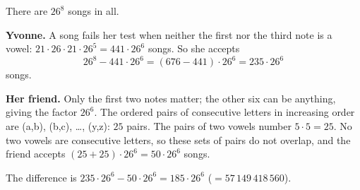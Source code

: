 There are $26^8$ songs in all.

\textbf{Yvonne.} A song fails her test when neither the first nor the third note is a vowel: $21\cdot26\cdot21\cdot26^5=441\cdot26^6$ songs. So she accepts
\[
26^8-441\cdot26^6=(676-441)\cdot26^6=235\cdot26^6
\]
songs.

\textbf{Her friend.} Only the first two notes matter; the other six can be anything, giving the factor $26^6$. The ordered pairs of consecutive letters in increasing order are (a,b), (b,c), \dots, (y,z): $25$ pairs. The pairs of two vowels number $5\cdot5=25$. No two vowels are consecutive letters, so these sets of pairs do not overlap, and the friend accepts $(25+25)\cdot26^6=50\cdot26^6$ songs.

The difference is $235\cdot26^6-50\cdot26^6=\boxed{185\cdot26^6}$ ($=57\,149\,418\,560$).
